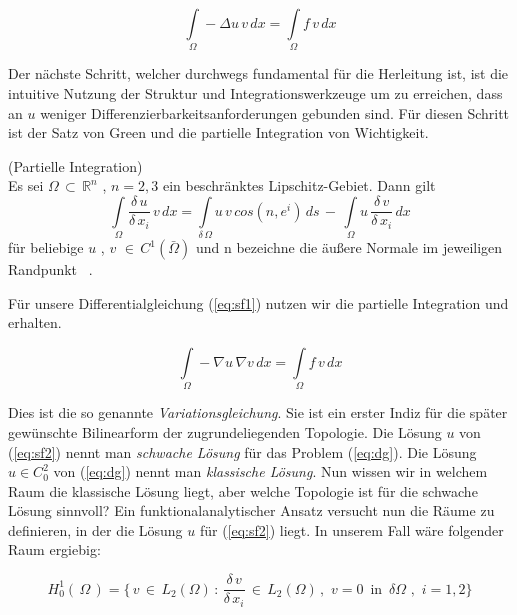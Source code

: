 \begin{equation}
\label{eq:sf1}
\int\limits_{\Omega} - \Delta u \, v  \, dx = \int\limits_{\Omega} f \, v  \, dx
\end{equation}

Der nächste Schritt, welcher durchwegs fundamental für die Herleitung ist, ist die intuitive Nutzung der Struktur und Integrationswerkzeuge um zu erreichen, dass an $u$ weniger Differenzierbarkeitsanforderungen gebunden sind. Für diesen Schritt ist der Satz von Green und die partielle Integration von Wichtigkeit.

\begin{Lemma} (Partielle Integration) \label{lemma:part} \\
Es sei $\Omega \, \subset \, \mathbb{R}^{n}$ , $n=2,3$ ein beschränktes Lipschitz-Gebiet. Dann gilt
\begin{equation*}
\int\limits_{\Omega} \dfrac{\delta \, u}{\delta \, x_i} \, v \, dx = \int\limits_{\delta \, \Omega} u \, v \, cos(n,e^i) \, ds \, - \, \int\limits_{\Omega} u \, \dfrac{\delta \, v}{\delta \, x_i} \, dx
\end{equation*}
für beliebige $u$ , $v$ $\in \, C^1(\bar{\Omega})$ und n bezeichne die äußere Normale im jeweiligen Randpunkt ~\cite[139]{Numerik}.
\end{Lemma}

Für unsere Differentialgleichung (\ref{eq:sf1}) nutzen wir die partielle Integration und erhalten.

\begin{equation} \label{eq:sf2}
\int\limits_{\Omega} - \nabla u \, \nabla v \, dx = \int\limits_{\Omega} f \, v \, dx
\end{equation}
  
Dies ist die so genannte \textit{Variationsgleichung}. Sie ist ein erster Indiz für die später gewünschte Bilinearform der zugrundeliegenden Topologie. 
Die Lösung $u$ von (\ref{eq:sf2}) nennt man \textit{schwache Lösung} für das Problem (\ref{eq:dg}).
Die Lösung $u \in C_{0}^{2}$ von (\ref{eq:dg}) nennt man \textit{klassische Lösung}. Nun wissen wir in welchem Raum die klassische Lösung liegt, aber welche Topologie ist für die schwache Lösung sinnvoll? 
Ein funktionalanalytischer Ansatz versucht nun die Räume zu definieren, in der die Lösung $u$ für (\ref{eq:sf2}) liegt. In unserem Fall wäre folgender Raum ergiebig:

\begin{equation*}
	H_{0}^{1}(\, \Omega\, ) = \{ \, v \, \in \, L_{2}(\Omega) \, : \, \dfrac{\delta \, v}{\delta \, x_{i}}  \, \in \, L_{2}(\Omega) \, , \, \, v=0 \, \text{ in } \, \delta \Omega \text{ , } \,  i=1,2 \}
\end{equation*}


